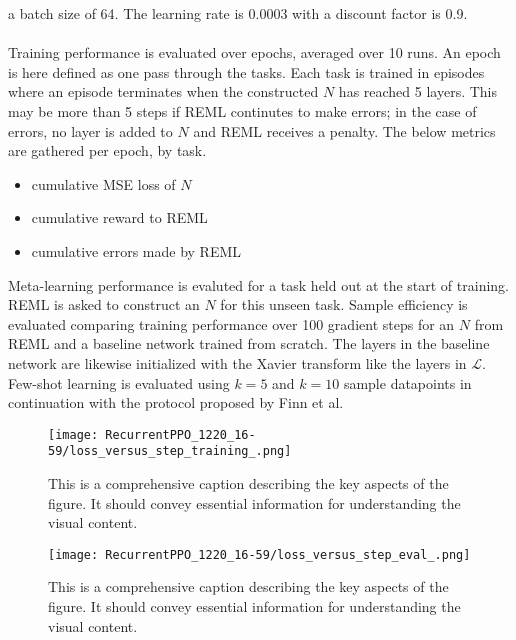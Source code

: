 a batch size of 64. The learning rate is 0.0003 with a discount factor is 0.9.
\\\\
Training performance is evaluated over epochs, averaged over 10 runs. 
An epoch is here defined as one pass through the tasks. 
Each task is trained in episodes where an episode terminates when the constructed
$N$ has reached 5 layers. This may be more than 5 steps if REML continutes to make 
errors; in the case of errors, no layer is added to $N$ and REML receives a penalty. 
The below metrics are gathered per epoch, by task.
\begin{itemize}
    \item cumulative MSE loss of $N$ 
    \item cumulative reward to REML
    \item cumulative errors made by REML
\end{itemize}
Meta-learning performance is evaluted for a task held out at the start of training. 
REML is asked to construct an $N$ for this unseen task. Sample efficiency is evaluated
comparing training performance over 100 gradient steps for an $N$ from REML and a 
baseline network trained from scratch. The layers in the baseline network are likewise
initialized with the Xavier transform like the layers in $\mathcal{L}$. Few-shot 
learning is evaluated using $k=5$ and $k=10$ sample datapoints in continuation with 
the protocol proposed by Finn et al.


\begin{figure}[htbp]  %
    \centering
    \texttt{[image: RecurrentPPO\_1220\_16-59/loss\_versus\_step\_training\_.png]}  %
    \caption{This is a comprehensive caption describing the key aspects of the figure. It should convey essential information for understanding the visual content.}
\end{figure}
\begin{figure}[htbp]  %
    \centering
    \texttt{[image: RecurrentPPO\_1220\_16-59/loss\_versus\_step\_eval\_.png]}  %
    \caption{This is a comprehensive caption describing the key aspects of the figure. It should convey essential information for understanding the visual content.}
\end{figure}




\minitoc 